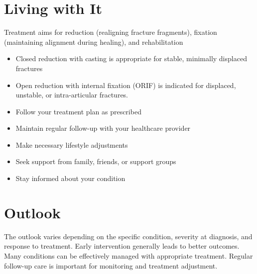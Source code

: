 \section{Living with It}
Treatment aims for reduction (realigning fracture fragments), fixation (maintaining alignment during healing), and rehabilitation

\begin{itemize}[noitemsep]
  \item Closed reduction with casting is appropriate for stable, minimally displaced fractures
  \item Open reduction with internal fixation (ORIF) is indicated for displaced, unstable, or intra-articular fractures.
  \item Follow your treatment plan as prescribed
  \item Maintain regular follow-up with your healthcare provider
  \item Make necessary lifestyle adjustments
  \item Seek support from family, friends, or support groups
  \item Stay informed about your condition
\end{itemize}
\section{Outlook}
The outlook varies depending on the specific condition, severity at diagnosis, and response to treatment. Early intervention generally leads to better outcomes. Many conditions can be effectively managed with appropriate treatment. Regular follow-up care is important for monitoring and treatment adjustment.
